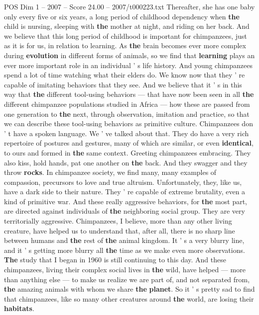 \begin{textsample}{POS Dim 1 – 2007 – Score 24.00 – 2007/t000223.txt}
Thereafter, she has one baby only every five or six years, a long period of childhood dependency when \textbf{the} child is nursing, sleeping with \textbf{the} mother at night, and riding on her back.
And we believe that this long period of childhood is important for chimpanzees, just as it is for us, in relation to learning.
As \textbf{the} brain becomes ever more complex during \textbf{evolution} in different forms of animals, so we find that \textbf{learning} plays an ever more important role in an individual ' s life history.
And young chimpanzees spend a lot of time watching what their elders do.
We know now that they ' re capable of imitating behaviors that they see.
And we believe that it ' s in this way that \textbf{the} different tool-using behaviors — that have now been seen in all \textbf{the} different chimpanzee populations studied in Africa — how these are passed from one generation to \textbf{the} next, through observation, imitation and practice, so that we can describe these tool-using behaviors as primitive culture.
Chimpanzees don ' t have a spoken language.
We ' ve talked about that.
They do have a very rich repertoire of postures and gestures, many of which are similar, or even \textbf{identical}, to ours and formed in \textbf{the} same context.
Greeting chimpanzees embracing.
They also kiss, hold hands, pat one another on \textbf{the} back.
And they swagger and they throw \textbf{rocks}.
In chimpanzee society, we find many, many examples of compassion, precursors to love and true altruism.
Unfortunately, they, like us, have a dark side to their nature.
They ' re capable of extreme brutality, even a kind of primitive war.
And these really aggressive behaviors, for \textbf{the} most part, are directed against individuals of \textbf{the} neighboring social group.
They are very territorially aggressive.
Chimpanzees, I believe, more than any other living creature, have helped us to understand that, after all, there is no sharp line between humans and \textbf{the} rest of \textbf{the} animal kingdom.
It ' s a very blurry line, and it ' s getting more blurry all \textbf{the} time as we make even more observations. \textbf{The} study that I began in 1960 is still continuing to this day.
And these chimpanzees, living their complex social lives in \textbf{the} wild, have helped — more than anything else — to make us realize we are part of, and not separated from, \textbf{the} amazing animals with whom we share \textbf{the} \textbf{planet}.
So it ' s pretty sad to find that chimpanzees, like so many other creatures around \textbf{the} world, are losing their \textbf{habitats}.

\end{textsample}
